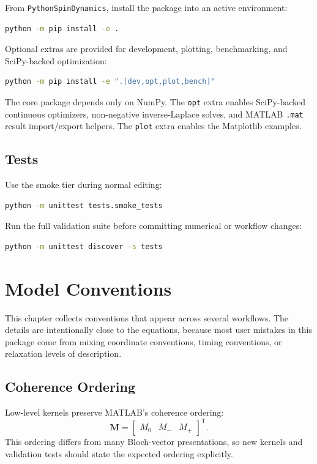 \documentclass[11pt,oneside]{report}
\newcommand{\code}[1]{\texttt{#1}}
\begin{document}
From \code{PythonSpinDynamics}, install the package into an active environment:

\begin{lstlisting}[language=bash]
python -m pip install -e .
\end{lstlisting}

Optional extras are provided for development, plotting, benchmarking, and
SciPy-backed optimization:

\begin{lstlisting}[language=bash]
python -m pip install -e ".[dev,opt,plot,bench]"
\end{lstlisting}

The core package depends only on NumPy. The \code{opt} extra enables SciPy-backed
continuous optimizers, non-negative inverse-Laplace solves, and MATLAB
\code{.mat} result import/export helpers. The \code{plot} extra enables the
Matplotlib examples.

\section{Tests}

Use the smoke tier during normal editing:

\begin{lstlisting}[language=bash]
python -m unittest tests.smoke_tests
\end{lstlisting}

Run the full validation suite before committing numerical or workflow changes:

\begin{lstlisting}[language=bash]
python -m unittest discover -s tests
\end{lstlisting}

\chapter{Model Conventions}

This chapter collects conventions that appear across several workflows. The
details are intentionally close to the equations, because most user mistakes in
this package come from mixing coordinate conventions, timing conventions, or
relaxation levels of description.

\section{Coherence Ordering}

Low-level kernels preserve MATLAB's coherence ordering:
\[
  \mathbf{M} =
  \begin{bmatrix}
    M_0 & M_- & M_+
  \end{bmatrix}^{\mathsf{T}} .
\]
This ordering differs from many Bloch-vector presentations, so new kernels and
validation tests should state the expected ordering explicitly.
\end{document}
